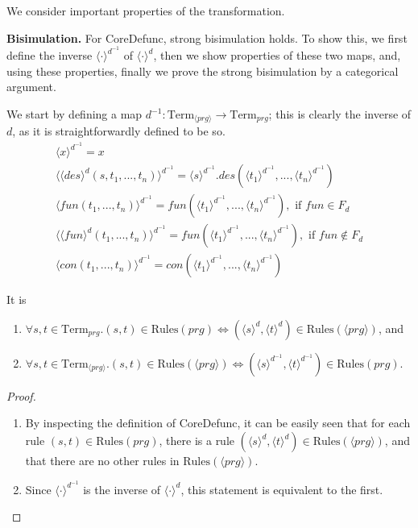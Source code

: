 \begin{algorithm}
\end{algorithm}

We consider important properties of the transformation.

\textbf{Bisimulation.} For \textsf{CoreDefunc}, strong bisimulation holds. To show this, we first define the inverse $\langle \cdot \rangle^{d^{-1}}$ of $\langle \cdot \rangle^d$, then we show properties of these two maps, and, using these properties, finally we prove the strong bisimulation by a categorical argument.

We start by defining a map $d^{-1}: \textrm{Term}_{\langle prg \rangle} \to \textrm{Term}_{prg}$; this is clearly the inverse of $d$, as it is straightforwardly defined to be so.
\begin{align*}
\langle x \rangle^{d^{-1}} = x \\
\langle \langle des \rangle^d (s, t_1, ..., t_n) \rangle^{d^{-1}} = \langle s \rangle^{d^{-1}}.des(\langle t_1 \rangle^{d^{-1}}, ..., \langle t_n \rangle^{d^{-1}}) \\
\langle fun(t_1, ..., t_n) \rangle^{d^{-1}} = fun(\langle t_1 \rangle^{d^{-1}}, ..., \langle t_n \rangle^{d^{-1}}), \text{ if } fun \in F_d \\
\langle \langle fun \rangle^d (t_1, ..., t_n) \rangle^{d^{-1}} = fun(\langle t_1 \rangle^{d^{-1}}, ..., \langle t_n \rangle^{d^{-1}}), \text{ if } fun \not\in F_d \\
\langle con(t_1, ..., t_n) \rangle^{d^{-1}} = con(\langle t_1 \rangle^{d^{-1}}, ..., \langle t_n \rangle^{d^{-1}})
\end{align*}

\begin{lemma}[Isomorphism $d$]\label{lem:iso} It is
\begin{enumerate}
\item $\forall s,t \in \textrm{Term}_{prg}. (s, t) \in \textrm{Rules}({prg}) \iff (\langle s \rangle^d, \langle t \rangle^d) \in \textrm{Rules}({\langle prg \rangle})$, and

\item $\forall s,t \in \textrm{Term}_{\langle prg \rangle}. (s, t) \in \textrm{Rules}({\langle prg \rangle}) \iff (\langle s \rangle^{d^{-1}}, \langle t \rangle^{d^{-1}}) \in \textrm{Rules}({prg})$.
\end{enumerate}

\begin{proof}
\begin{enumerate}
\item By inspecting the definition of \textsf{CoreDefunc}, it can be easily seen that for each rule $(s, t) \in \textrm{Rules}(prg)$, there is a rule $(\langle s \rangle^d, \langle t \rangle^d) \in \textrm{Rules}(\langle prg \rangle)$, and that there are no other rules in $\textrm{Rules}(\langle prg \rangle)$.

\item Since $\langle \cdot \rangle^{d^{-1}}$ is the inverse of $\langle \cdot \rangle^d$, this statement is equivalent to the first.
\end{enumerate}
\end{proof}
\end{lemma}

